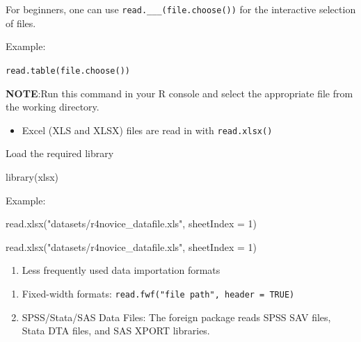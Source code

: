\documentclass[
  letterpaper,
  DIV=11,
  numbers=noendperiod]{scrreprt}
\newenvironment{Shaded}{}{}
\newcommand{\AttributeTok}[1]{\textcolor[rgb]{0.84,0.23,0.29}{#1}}
\newcommand{\DecValTok}[1]{\textcolor[rgb]{0.00,0.36,0.77}{#1}}
\newcommand{\FunctionTok}[1]{\textcolor[rgb]{0.44,0.26,0.76}{#1}}
\newcommand{\NormalTok}[1]{\textcolor[rgb]{0.14,0.16,0.18}{#1}}
\newcommand{\StringTok}[1]{\textcolor[rgb]{0.01,0.18,0.38}{#1}}
\providecommand{\tightlist}{%
  \setlength{\itemsep}{0pt}\setlength{\parskip}{0pt}}\usepackage{longtable,booktabs,array}
\begin{document}
For beginners, one can use \texttt{read.\_\_\_(file.choose())} for the
interactive selection of files.

Example:

\texttt{read.table(file.choose())}

\textbf{NOTE}:Run this command in your R console and select the
appropriate file from the working directory.

\begin{itemize}
\tightlist
\item
  Excel (XLS and XLSX) files are read in with \texttt{read.xlsx()}
\end{itemize}

Load the required library

\begin{Shaded}
\begin{Highlighting}[]
\FunctionTok{library}\NormalTok{(xlsx)}
\end{Highlighting}
\end{Shaded}

Example:

\begin{Shaded}
\begin{Highlighting}[]
\FunctionTok{read.xlsx}\NormalTok{(}\StringTok{"datasets/r4novice\_datafile.xls"}\NormalTok{, }\AttributeTok{sheetIndex =} \DecValTok{1}\NormalTok{)}
\end{Highlighting}
\end{Shaded}

\begin{Shaded}
\begin{Highlighting}[]
\FunctionTok{read.xlsx}\NormalTok{(}\StringTok{"datasets/r4novice\_datafile.xls"}\NormalTok{, }\AttributeTok{sheetIndex =} \DecValTok{1}\NormalTok{)}
\end{Highlighting}
\end{Shaded}

\begin{enumerate}
\def\labelenumi{\arabic{enumi}.}
\setcounter{enumi}{1}
\tightlist
\item
  Less frequently used data importation formats
\end{enumerate}

\begin{enumerate}
\def\labelenumi{\alph{enumi}.}
\item
  Fixed-width formats: \texttt{read.fwf("file\ path",\ header\ =\ TRUE)}
\item
  SPSS/Stata/SAS Data Files: The foreign package reads SPSS SAV files,
  Stata DTA files, and SAS XPORT libraries.
\end{enumerate}
\end{document}
